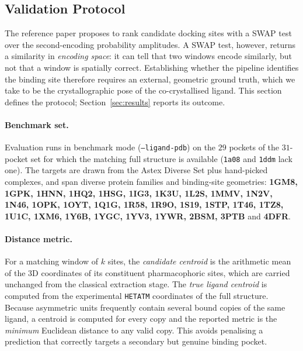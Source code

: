 \subsection{Validation Protocol}
\label{sec:validation}

The reference paper proposes to rank candidate docking sites with a SWAP test over the
second-encoding probability amplitudes. A SWAP test, however, returns a similarity in
\emph{encoding space}: it can tell that two windows encode similarly, but not that a
window is spatially correct. Establishing whether the pipeline identifies the binding
site therefore requires an external, geometric ground truth, which we take to be the
crystallographic pose of the co-crystallised ligand. This section defines the protocol;
Section~\ref{sec:results} reports its outcome.

\paragraph{Benchmark set.}
Evaluation runs in benchmark mode (\texttt{--ligand-pdb}) on the $29$ pockets of the
$31$-pocket set for which the matching full structure is available (\texttt{1a08} and
\texttt{1ddm} lack one). The targets are drawn from the Astex Diverse Set plus
hand-picked complexes, and span diverse protein families and binding-site geometries:
\textbf{1GM8, 1GPK, 1HNN, 1HQ2, 1HSG, 1IG3, 1K3U, 1L2S, 1MMV, 1N2V, 1N46, 1OPK, 1OYT,
1Q1G, 1R58, 1R9O, 1S19, 1STP, 1T46, 1TZ8, 1U1C, 1XM6, 1Y6B, 1YGC, 1YV3, 1YWR, 2BSM,
3PTB} and \textbf{4DFR}.

\paragraph{Distance metric.}
For a matching window of $k$ sites, the \emph{candidate centroid} is the arithmetic mean
of the 3D coordinates of its constituent pharmacophoric sites, which are carried
unchanged from the classical extraction stage. The \emph{true ligand centroid} is
computed from the experimental \texttt{HETATM} coordinates of the full structure. Because
asymmetric units frequently contain several bound copies of the same ligand, a centroid
is computed for every copy and the reported metric is the \emph{minimum} Euclidean
distance to any valid copy. This avoids penalising a prediction that correctly targets a
secondary but genuine binding pocket.

